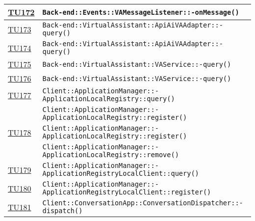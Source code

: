 \begin{longtable}{|>{\centering}m{1cm}|m{12cm}<{\centering}|}
\hyperlink{TU172}{TU172} & \texttt{Back-end::Events::VAMessageListener::-\linebreak onMessage()}\\ \hline

\hyperlink{TU173}{TU173} & \texttt{Back-end::VirtualAssistant::ApiAiVAAdapter::-\linebreak query()}\\ \hline

\hyperlink{TU174}{TU174} & \texttt{Back-end::VirtualAssistant::ApiAiVAAdapter::-\linebreak query()}\\ \hline

\hyperlink{TU175}{TU175} & \texttt{Back-end::VirtualAssistant::VAService::-\linebreak query()}\\ \hline

\hyperlink{TU176}{TU176} & \texttt{Back-end::VirtualAssistant::VAService::-\linebreak query()}\\ \hline

\hyperlink{TU177}{TU177} & \texttt{Client::ApplicationManager::-\linebreak ApplicationLocalRegistry::query()}\\ & \texttt{Client::ApplicationManager::-\linebreak ApplicationLocalRegistry::register()}\\ \hline

\hyperlink{TU178}{TU178} & \texttt{Client::ApplicationManager::-\linebreak ApplicationLocalRegistry::register()}\\ & \texttt{Client::ApplicationManager::-\linebreak ApplicationLocalRegistry::remove()}\\ \hline

\hyperlink{TU179}{TU179} & \texttt{Client::ApplicationManager::-\linebreak ApplicationRegistryLocalClient::query()}\\ \hline

\hyperlink{TU180}{TU180} & \texttt{Client::ApplicationManager::-\linebreak ApplicationRegistryLocalClient::register()}\\ \hline

\hyperlink{TU181}{TU181} & \texttt{Client::ConversationApp::ConversationDispatcher::-\linebreak dispatch()}\\ \hline


\end{longtable}
